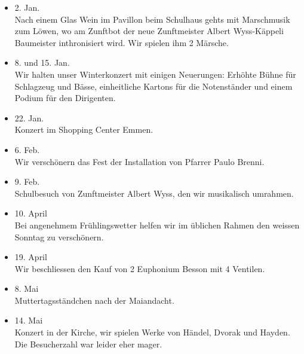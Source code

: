 \begin{history}


    \begin{itemize}

        \item[]2. Jan.\\
        Nach einem Glas Wein im Pavillon beim Schulhaus gehts mit Marschmusik
        zum Löwen, wo am Zunftbot der neue Zunftmeister Albert Wyss-Käppeli
        Baumeister inthronisiert wird. Wir spielen ihm 2 Märsche.

        \item[]8. und 15. Jan.\\
        Wir halten unser Winterkonzert mit einigen Neuerungen: Erhöhte Bühne für
        Schlagzeug und Bässe, einheitliche Kartons für die Notenständer und
        einem Podium für den Dirigenten.

        \item[]22. Jan.\\
        Konzert im Shopping Center Emmen.

        \item[]6. Feb.\\
        Wir verschönern das Fest der Installation von Pfarrer Paulo Brenni.

        \item[]9. Feb.\\
        Schulbesuch von Zunftmeister Albert Wyss, den wir musikalisch umrahmen.

        \item[]10. April\\
        Bei angenehmem Frühlingswetter helfen wir im üblichen Rahmen den weissen
        Sonntag zu verschönern.

        \item[]19. April\\
        Wir beschliessen den Kauf von 2 Euphonium Besson mit 4 Ventilen.

        \item[]8. Mai\\
        Muttertagsständchen nach der Maiandacht.

        \item[]14. Mai\\
        Konzert in der Kirche, wir spielen Werke von Händel, Dvorak und Hayden.
        Die Besucherzahl war leider eher mager.


\end{itemize}
\end{history}
